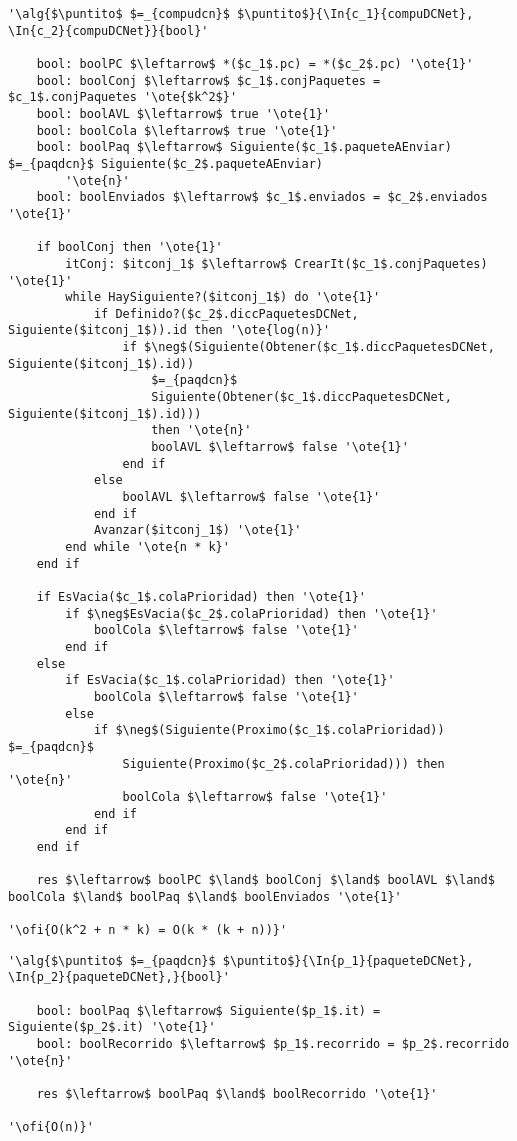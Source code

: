 \begin{lstlisting}[mathescape]
'\alg{$\puntito$ $=_{compudcn}$ $\puntito$}{\In{c_1}{compuDCNet}, \In{c_2}{compuDCNet}}{bool}'

	bool: boolPC $\leftarrow$ *($c_1$.pc) = *($c_2$.pc) '\ote{1}'
	bool: boolConj $\leftarrow$ $c_1$.conjPaquetes = $c_1$.conjPaquetes '\ote{$k^2$}'
	bool: boolAVL $\leftarrow$ true '\ote{1}'
	bool: boolCola $\leftarrow$ true '\ote{1}'
	bool: boolPaq $\leftarrow$ Siguiente($c_1$.paqueteAEnviar) $=_{paqdcn}$ Siguiente($c_2$.paqueteAEnviar)
		'\ote{n}'
	bool: boolEnviados $\leftarrow$ $c_1$.enviados = $c_2$.enviados '\ote{1}'

	if boolConj then '\ote{1}'
		itConj: $itconj_1$ $\leftarrow$ CrearIt($c_1$.conjPaquetes) '\ote{1}'
		while HaySiguiente?($itconj_1$) do '\ote{1}'
			if Definido?($c_2$.diccPaquetesDCNet, Siguiente($itconj_1$)).id then '\ote{log(n)}'
				if $\neg$(Siguiente(Obtener($c_1$.diccPaquetesDCNet, Siguiente($itconj_1$).id))
					$=_{paqdcn}$
					Siguiente(Obtener($c_1$.diccPaquetesDCNet, Siguiente($itconj_1$).id)))
					then '\ote{n}'
					boolAVL $\leftarrow$ false '\ote{1}'
				end if
			else
				boolAVL $\leftarrow$ false '\ote{1}'
			end if
			Avanzar($itconj_1$) '\ote{1}'
		end while '\ote{n * k}'
	end if

	if EsVacia($c_1$.colaPrioridad) then '\ote{1}'
		if $\neg$EsVacia($c_2$.colaPrioridad) then '\ote{1}'
			boolCola $\leftarrow$ false '\ote{1}'
		end if
	else
		if EsVacia($c_1$.colaPrioridad) then '\ote{1}'
			boolCola $\leftarrow$ false '\ote{1}'
		else
			if $\neg$(Siguiente(Proximo($c_1$.colaPrioridad)) $=_{paqdcn}$
				Siguiente(Proximo($c_2$.colaPrioridad))) then '\ote{n}'
				boolCola $\leftarrow$ false '\ote{1}'
			end if
		end if
	end if

	res $\leftarrow$ boolPC $\land$ boolConj $\land$ boolAVL $\land$ boolCola $\land$ boolPaq $\land$ boolEnviados '\ote{1}'

'\ofi{O(k^2 + n * k) = O(k * (k + n))}'
\end{lstlisting}

\begin{lstlisting}[mathescape]
'\alg{$\puntito$ $=_{paqdcn}$ $\puntito$}{\In{p_1}{paqueteDCNet}, \In{p_2}{paqueteDCNet},}{bool}'

	bool: boolPaq $\leftarrow$ Siguiente($p_1$.it) = Siguiente($p_2$.it) '\ote{1}'
	bool: boolRecorrido $\leftarrow$ $p_1$.recorrido = $p_2$.recorrido '\ote{n}'

	res $\leftarrow$ boolPaq $\land$ boolRecorrido '\ote{1}'

'\ofi{O(n)}'
\end{lstlisting}
